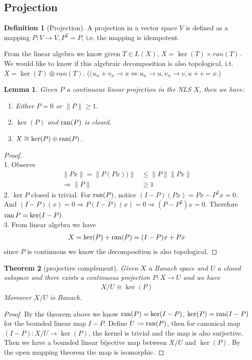 \documentclass[a4paper,11pt,fleqn]{book}
\newtheorem{theorem}{Theorem}[section]
\newtheorem{lemma}[theorem]{Lemma}
\theoremstyle{definition}
\newtheorem{definition}{Definition}[section]
\theoremstyle{remark}
\begin{document}
\subsection{Projection}
\begin{definition}[Projection]
	A projection in a vector space $V$ is defined as a mapping $P: V \rightarrow V, P^2 = P$, i.e. the mapping is idempotent. 
\end{definition}

From the linear algebra we know given $T \in L(X)$, $X = \ker(T) \times ran(T)$. We would like to know if this algebraic decomposition is also topological, i.t. $X = \ker(T) \oplus ran(T)$. ($(u_n + v_n \rightarrow x \Leftrightarrow u_n \rightarrow u, v_n \rightarrow v, u+v = x$.)

\begin{lemma}
	Given $P$ a continuous linear projection in the NLS $X$, then we have:
	\begin{enumerate}
		\item Either $P = 0$ or $\|P\| \geq 1$.
		\item $\ker(P)$ and $\operatorname{ran}(P)$ is closed.
		\item $X \cong \ker(P) \oplus \operatorname{ran}(P)$.
	\end{enumerate}
\end{lemma}
\begin{proof}\quad\\
1. 
Observe
\begin{align*}
		\|Px\| = \|P(Px))\| &\le \|P\|\|Px\|\\
		\Rightarrow \|P\| &\geq 1
\end{align*}
2. $\ker P$ closed is trivial. For $\operatorname{ran} (P)$, notice $(I - P)(Px) = Px - P^2x = 0$. And $(I - P)(x) = 0 \Rightarrow P (I - P)(x) = 0 \Rightarrow (P - P^2)x = 0$. Therefore $\operatorname{ran} P = \ker (I - P)$.\\
3.  From linear algebra we have
\begin{align*}
	X = \ker (P) + \operatorname{ran}(P) = (I - P)x +   Px
\end{align*}
since $P$ is continuous we know the decomposition is also topological.
\end{proof}

\begin{theorem}[projective complement]
	Given $X$ a Banach space and $U$ a closed subspace and there exists a continuous projection $P: X \rightarrow U$ and we have
	\begin{align*}
		X \slash U \cong \ker (P)
	\end{align*}
	Moreover $X \slash U$ is Banach.
\end{theorem}
\begin{proof}
	By the theorem above we know $\operatorname{ran}(P) = \ker (I - P)$, $\ker(P) = \operatorname{ran}(I - P)$ for the bounded linear map $I - P$. Define $U := \operatorname{ran}(P)$, then for canonical map $(I- P): X\slash U \rightarrow \ker(P)$, the kernel is trivial and the map is also surjective. Then we have a bounded linear bijective map between $X\slash U$ and $\ker(P)$. By the open mapping theorem the map is isomorphic. 
\end{proof}
\end{document}

